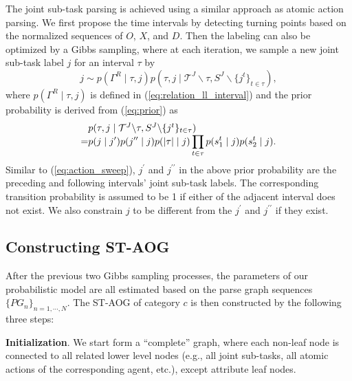 \documentclass[letterpaper, 10 pt, conference]{ieeeconf}  %
\begin{document}
The joint sub-task parsing is achieved using a similar approach as atomic action parsing. We first propose the time intervals by detecting turning points based on the normalized sequences of $O$, $X$, and $D$. Then the labeling can also be optimized by a Gibbs sampling, where at each iteration, we sample a new joint sub-task label $j$ for an interval $\tau$ by
\begin{equation}
j \sim p(\Gamma^R \mid \tau, j)p(\tau, j \mid \mathcal{T}^J \backslash \tau, S^J \backslash \{j^t\}_{t \in \tau}),
\end{equation}
where $p(\Gamma^R \mid \tau, j)$ is defined in (\ref{eq:relation_ll_interval}) and the prior probability is derived from (\ref{eq:prior}) as
\begin{equation}
\setlength{\arraycolsep}{0pt}
\begin{array}{lcl}
&&p(\tau, j \mid \mathcal{T}^J \backslash \tau, S^J \backslash \{j^t\}_{t \in \tau})\\
&=&\displaystyle p(j \mid j^\prime)p(j^{\prime\prime} \mid j)p(|\tau| \mid j)\prod_{t\in \tau} p(s_1^t \mid j)p(s_2^t \mid j).
\end{array}
\label{eq:joint_sweep}
\end{equation}
Similar to (\ref{eq:action_sweep}), $j^\prime$ and $j^{\prime\prime}$ in the above prior probability are the preceding and following intervals' joint sub-task labels. The corresponding transition probability is assumed to be 1 if either of the adjacent interval does not exist. We also constrain $j$ to be different from the $j^\prime$ and $j^{\prime\prime}$ if they exist.





\subsection{Constructing ST-AOG}

After the previous two Gibbs sampling processes, the parameters of our probabilistic model are all estimated based on the parse graph sequences $\{PG_n\}_{n=1,\cdots,N}$. The ST-AOG of category $c$ is then constructed by the following three steps:
 
 \textbf{Initialization}. We start form a ``complete'' graph, where each non-leaf node is connected to all related lower level nodes (e.g., all joint sub-tasks, all atomic actions of the corresponding agent, etc.), except attribute leaf nodes. 
 
\end{document}
